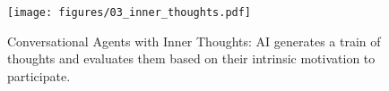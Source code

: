 \begin{figure}
    \centering
  \texttt{[image: figures/03\_inner\_thoughts.pdf]}
    \caption{Conversational Agents with Inner Thoughts: AI generates a train of thoughts and evaluates them based on their intrinsic motivation to participate.}
    \label{fig:inner_thoughts}
\end{figure}
